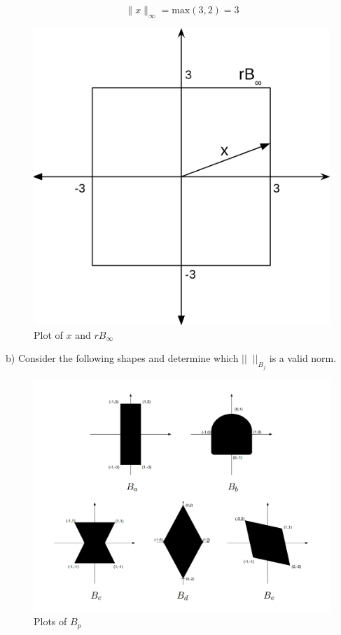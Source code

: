 \documentclass[12pt]{article}
\begin{document}
\begin{enumerate}
\begin{framed}
\[\|x\|_\infty=\text{max}(3,2)=3\]
\end{framed}
\begin{figure}[h]
    \caption{Plot of $x$ and $rB_\infty$}
    \centering
    \includegraphics[scale=0.25]{linf.png}
\end{figure}

\newpage

b) Consider the following shapes and determine which $||\;\;||_{B_j}$ is a valid norm.

\begin{figure}[h]
    \caption{Plots of $B_p$}
    \centering
    \includegraphics[scale=0.25]{normshapes.png}
\end{figure}


\end{enumerate}
\end{document}
